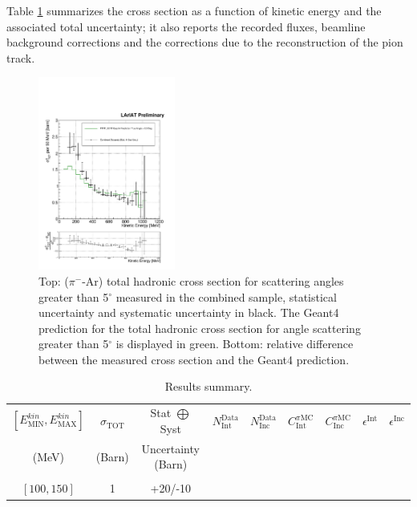 \documentclass[aps,prl,twocolumn,showpacs,superscriptaddress,groupedaddress]{revtex4}  %
\begin{document}
Table \ref{tab:XSsummary} summarizes the cross section as a function of kinetic energy and  the associated total uncertainty; it also reports the recorded fluxes,  beamline background corrections and the  corrections due to the reconstruction of the pion track.\\


\begin{figure}
\includegraphics[width =0.4\textwidth ]{TheRealMoneyPlot}
\caption{\label{fig:epsart} Top: ($\pi^-$-Ar) total hadronic cross section for  scattering angles greater than 5$^\circ$ measured in the combined sample, statistical uncertainty and systematic uncertainty in black. The Geant4 prediction for the total hadronic cross section for angle scattering greater than 5$^\circ$ is displayed in green. Bottom: relative difference between the measured cross section and the Geant4 prediction. }
\end{figure}

\begin{table}
\caption{\label{tab:XSsummary} Results summary. }
\begin{ruledtabular}
\begin{tabular}{ccccccccc}
$[E^{kin}_{\text{MIN}}, E^{kin}_{\text{MAX}}]$ & $\sigma_{\text{TOT}}$ & Stat $\bigoplus$ Syst  & $N^{ \text{Data}}_{ \text{Int}}$
& $N^{ \text{Data}}_{ \text{Inc}}$ & $C^{\pi \text{MC}}_{\text{Int}}$  & $C^{\pi \text{MC}}_{\text{Inc}}$ & $ \epsilon^{\text{Int}} $ & $\epsilon^{\text{Inc}}$ \\ 
(MeV)& (Barn)& Uncertainty (Barn) & & & & & \\\hline
& & & & & & &\\
 $[100,150]$ &1&+20/-10 & & & & & &\\
\end{tabular}
\end{ruledtabular}
\end{table}
\end{document}
